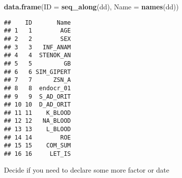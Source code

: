 \documentclass[
]{article}
\newenvironment{Shaded}{\begin{snugshade}}{\end{snugshade}}
\newcommand{\AttributeTok}[1]{\textcolor[rgb]{0.13,0.29,0.53}{#1}}
\newcommand{\FunctionTok}[1]{\textcolor[rgb]{0.13,0.29,0.53}{\textbf{#1}}}
\newcommand{\NormalTok}[1]{#1}
\begin{document}
\begin{Shaded}
\begin{Highlighting}[]
\FunctionTok{data.frame}\NormalTok{(}\AttributeTok{ID =} \FunctionTok{seq\_along}\NormalTok{(dd), }\AttributeTok{Name =} \FunctionTok{names}\NormalTok{(dd))}
\end{Highlighting}
\end{Shaded}

\begin{verbatim}
##    ID       Name
## 1   1        AGE
## 2   2        SEX
## 3   3   INF_ANAM
## 4   4  STENOK_AN
## 5   5         GB
## 6   6 SIM_GIPERT
## 7   7      ZSN_A
## 8   8  endocr_01
## 9   9  S_AD_ORIT
## 10 10  D_AD_ORIT
## 11 11    K_BLOOD
## 12 12   NA_BLOOD
## 13 13    L_BLOOD
## 14 14        ROE
## 15 15    COM_SUM
## 16 16     LET_IS
\end{verbatim}

Decide if you need to declare some more factor or date
\end{document}
